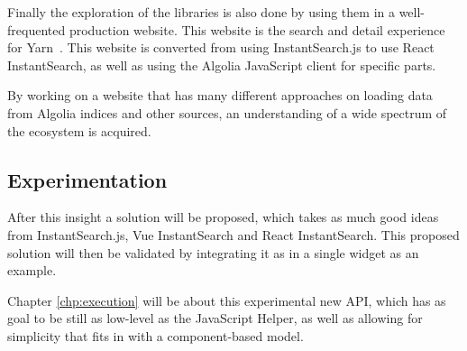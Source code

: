Finally the exploration of the libraries is also done by using them in a well-frequented production website. This website is the search and detail experience for Yarn\cite{yarn-site}~. This website is converted from using InstantSearch.js to use React InstantSearch, as well as using the Algolia JavaScript client for specific parts.

By working on a website that has many different approaches on loading data from Algolia indices and other sources, an understanding of a wide spectrum of the ecosystem is acquired.

\subsection{Experimentation}

After this insight a solution will be proposed, which takes as much good ideas from InstantSearch.js, Vue InstantSearch and React InstantSearch. This proposed solution will then be validated by integrating it as in a single widget as an example.

Chapter \ref{chp:execution} will be about this experimental new API, which has as goal to be still as low-level as the JavaScript Helper, as well as allowing for simplicity that fits in with a component-based model.
